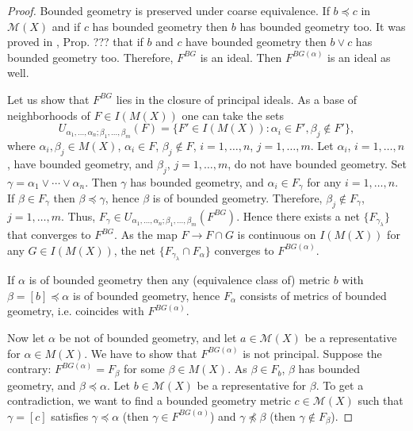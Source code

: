 \documentclass[10pt,a4paper]{amsart}
\numberwithin{equation}{section}
\begin{document}
\begin{proof}
Bounded geometry is preserved under coarse equivalence. If $b\preceq c$ in $\mathcal M(X)$ and if $c$ has bounded geometry then $b$ has bounded geometry too. It was proved in \cite{Man-Zhu}, Prop. ??? that if $b$ and $c$ have bounded geometry then $b\lor c$ has bounded geometry too. Therefore, $F^{BG}$ is an ideal. Then $F^{BG(\alpha)}$ is an ideal as well. 


Let us show that $F^{BG}$ lies in the closure of principal ideals. As a base of neighborhoods of $F\in I(M(X))$ one can take the sets 
$$
U_{\alpha_1,\ldots,\alpha_n;\beta_1,\ldots,\beta_m}(F)=\{F'\in I(M(X)): \alpha_i\in F', \beta_j\notin F'\}, 
$$  
where $\alpha_i,\beta_j\in M(X)$, $\alpha_i\in F$, $\beta_j\notin F$, $i=1,\ldots,n$, $j=1,\ldots,m$. 
Let $\alpha_i$, $i=1,\ldots,n$, have bounded geometry, and $\beta_j$, $j=1,\ldots,m$, do not have bounded geometry. Set $\gamma=\alpha_1\lor\cdots\lor \alpha_n$. Then $\gamma$ has bounded geometry, and $\alpha_i\in F_\gamma$ for any $i=1,\ldots,n$. If $\beta\in F_\gamma$ then $\beta\preceq \gamma$, hence $\beta$ is of bounded geometry. Therefore, $\beta_j\notin F_\gamma$, $j=1,\ldots,m$. Thus, $F_\gamma\in U_{\alpha_1,\ldots,\alpha_n;\beta_1,\ldots,\beta_m}(F^{BG})$. Hence there exists a net $\{F_{\gamma_\lambda}\}$ that converges to $F^{BG}$. As the map $F\to F\cap G$ is continuous on $I(M(X))$ for any $G\in I(M(X))$, the net $\{F_{\gamma_\lambda}\cap F_\alpha\}$ converges to $F^{BG(\alpha)}$.

If $\alpha$ is of bounded geometry then any (equivalence class of) metric $b$ with $\beta=[b]\preceq \alpha$ is of bounded geometry, hence $F_\alpha$ consists of metrics of bounded geometry, i.e. coincides with $F^{BG(\alpha)}$. 

Now let $\alpha$ be not of bounded geometry, and let $a\in\mathcal M(X)$ be a representative for $\alpha\in M(X)$. We have to show that $F^{BG(\alpha)}$ is not principal. Suppose the contrary: $F^{BG(\alpha)}=F_\beta$ for some $\beta\in M(X)$. As $\beta\in F_b$, $\beta$ has bounded geometry, and $\beta\preceq \alpha$. Let $b\in\mathcal M(X)$ be a representative for $\beta$. To get a contradiction, we want to find a bounded geometry metric $c\in\mathcal M(X)$ such that $\gamma=[c]$ satisfies $\gamma\preceq \alpha$ (then $\gamma\in F^{BG(\alpha)}$) and $\gamma\npreceq \beta$ (then $\gamma\notin F_\beta$). 


\end{proof}
\end{document}
